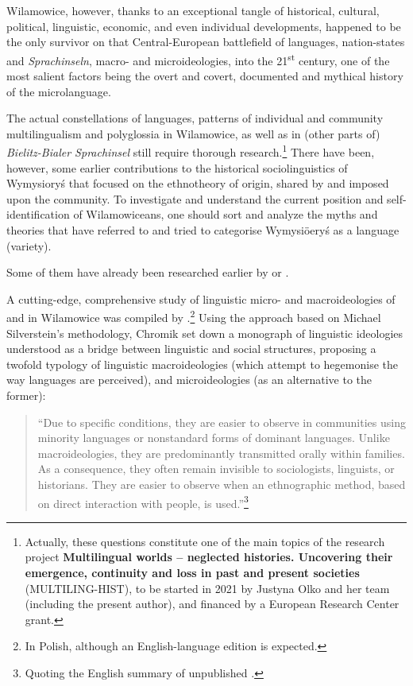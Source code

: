\documentclass[output=paper]{langscibook}
\begin{document}
Wilamowice, however, thanks to an exceptional tangle of historical, cultural, political, linguistic, economic, and even individual developments, happened to be the only survivor on that Central-European battlefield of languages, nation-states and \textit{Sprachinseln}, macro- and microideologies, into the 21\textsuperscript{st} century, one of the most salient factors being the overt and covert, documented and mythical history of the microlanguage.

The actual constellations of languages, patterns of individual and community multilingualism and polyglossia in Wilamowice, as well as in (other parts of) \textit{Bielitz-Bialer Sprachinsel} still require thorough research.\footnote{Actually, these questions constitute one of the main topics of the research project \textbf{Multilingual worlds – neglected histories. Uncovering their emergence, continuity and loss in past and present societies} (MULTILING-HIST), to be started in 2021 by Justyna Olko and her team (including the present author), and financed by a European Research Center grant.}
There have been, however, some earlier contributions to the historical sociolinguistics of Wymysioryś that focused on the ethnotheory of origin, shared by and imposed upon the community. To investigate and understand the current position and self-identification of Wilamowiceans, one should sort and analyze the myths and theories that have referred to and tried to categorise Wymysiöeryś as a language (variety).

Some of them have already been researched earlier by \citet{morciniec_flamische_1984, ryckeboer_flamen_1984, morciniec_stellung_1995, wicherkiewicz_making_2003, ritchie_considerations_2012, wicherkiewicz_researching_2016} or \citet{wicherkiewicz_awakening_2018}.

A cutting-edge, comprehensive study of linguistic micro- and macroideologies of and in Wilamowice was compiled by \citet{chromik_mikro_2019}.\footnote{In Polish, although an English-language edition is expected.}
Using the approach based on Michael Silverstein’s methodology, Chromik set down a monograph of linguistic ideologies understood as a bridge between linguistic and social structures, proposing a twofold typology of linguistic macroideologies (which attempt to hegemonise the way languages are perceived), and microideologies (as an alternative to the former):

\begin{quote}
    “Due to specific conditions, they are easier to observe in communities using minority languages or nonstandard forms of dominant languages. Unlike macroideologies, they are predominantly transmitted orally within families. As a consequence, they often remain invisible to sociologists, linguists, or historians. They are easier to observe when an ethnographic method, based on direct interaction with people, is used.”\footnote{Quoting the English summary of unpublished \citealt{chromik_mikro_2019}.}
\end{quote}
\end{document}
